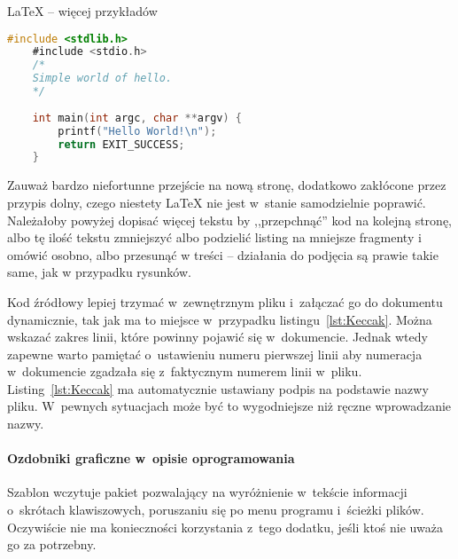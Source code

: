 \begin{easyappendix}{\LaTeX{} -- więcej przykładów}
\begin{lstlisting}[language=C,
	backgroundcolor=\color{EEGold!5!white},
	caption={Prosty kod w~języku C},
	label={lst:helloC}]
	#include <stdlib.h>
	#include <stdio.h>
	/* 
	Simple world of hello.
	*/
	
	int main(int argc, char **argv) {
		printf("Hello World!\n");
		return EXIT_SUCCESS;
	}
\end{lstlisting}

Zauważ bardzo niefortunne przejście na nową stronę, dodatkowo zakłócone przez przypis dolny, czego niestety \LaTeX{} nie jest w~stanie samodzielnie poprawić. Należałoby powyżej dopisać więcej tekstu by ,,przepchnąć'' kod na kolejną stronę, albo tę ilość tekstu zmniejszyć albo podzielić listing na mniejsze fragmenty i omówić osobno, albo przesunąć w treści -- działania do podjęcia są prawie takie same, jak w przypadku rysunków.

Kod źródłowy lepiej trzymać w~zewnętrznym pliku i~załączać go do dokumentu dynamicznie, tak jak ma to miejsce w~przypadku listingu~\ref{lst:Keccak}. Można wskazać zakres linii, które powinny pojawić się w~dokumencie. Jednak wtedy zapewne warto pamiętać o~ustawieniu numeru pierwszej linii aby numeracja w~dokumencie zgadzała się z~faktycznym numerem linii w~pliku. Listing~\ref{lst:Keccak} ma automatycznie ustawiany podpis na podstawie nazwy pliku. W~pewnych sytuacjach może być to wygodniejsze niż ręczne wprowadzanie nazwy.



\paragraph{Ozdobniki graficzne w~opisie oprogramowania}
Szablon wczytuje pakiet pozwalający na wyróżnienie w~tekście informacji o~skrótach klawiszowych, poruszaniu się po menu programu i~ścieżki plików. Oczywiście nie ma konieczności korzystania z~tego dodatku, jeśli ktoś nie uważa go za potrzebny.


\end{easyappendix}
